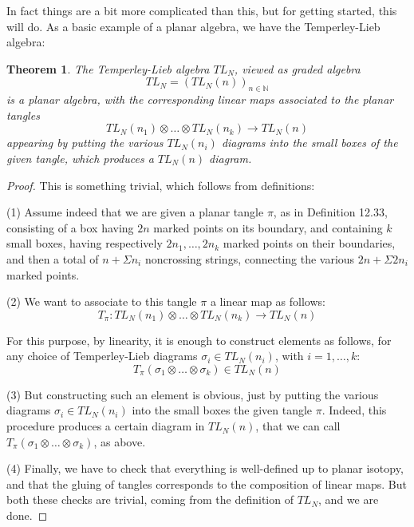 \documentclass[12pt]{amsbook}
\newtheorem{theorem}{Theorem}[chapter]
\begin{document}
In fact things are a bit more complicated than this, but for getting started, this will do. As a basic example of a planar algebra, we have the Temperley-Lieb algebra:


\begin{theorem}
The Temperley-Lieb algebra $TL_N$, viewed as graded algebra
$$TL_N=(TL_N(n))_{n\in\mathbb N}$$
is a planar algebra, with the corresponding linear maps associated to the planar tangles
$$TL_N(n_1)\otimes\ldots\otimes TL_N(n_k)\to TL_N(n)$$
appearing by putting the various $TL_N(n_i)$ diagrams into the small boxes of the given tangle, which produces a $TL_N(n)$ diagram.
\end{theorem}

\begin{proof}
This is something trivial, which follows from definitions:

\medskip

(1) Assume indeed that we are given a planar tangle $\pi$, as in Definition 12.33, consisting of a box having $2n$ marked points on its boundary, and containing $k$ small boxes, having respectively $2n_1,\ldots,2n_k$ marked points on their boundaries, and then a total of $n+\Sigma n_i$ noncrossing strings, connecting the various $2n+\Sigma 2n_i$ marked points.

\medskip

(2) We want to associate to this tangle $\pi$ a linear map as follows:
$$T_\pi:TL_N(n_1)\otimes\ldots\otimes TL_N(n_k)\to TL_N(n)$$

For this purpose, by linearity, it is enough to construct elements as follows, for any choice of Temperley-Lieb diagrams $\sigma_i\in TL_N(n_i)$, with $i=1,\ldots,k$:
$$T_\pi(\sigma_1\otimes\ldots\otimes\sigma_k)\in TL_N(n)$$

(3) But constructing such an element is obvious, just by putting the various diagrams $\sigma_i\in TL_N(n_i)$ into the small boxes the given tangle $\pi$. Indeed, this procedure produces a certain diagram in $TL_N(n)$, that we can call $T_\pi(\sigma_1\otimes\ldots\otimes\sigma_k)$, as above.

\medskip

(4) Finally, we have to check that everything is well-defined up to planar isotopy, and that the gluing of tangles corresponds to the composition of linear maps. But both these checks are trivial, coming from the definition of $TL_N$, and we are done.
\end{proof}
\end{document}
